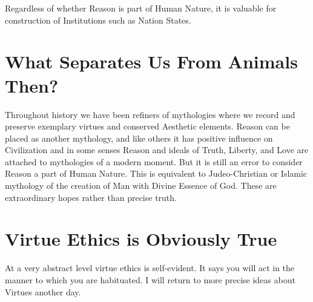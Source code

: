 \documentclass{amsart}
\begin{document}
Regardless of whether Reason is part of Human Nature, it is valuable for construction of Institutions such as Nation States.  

\section{What Separates Us From Animals Then?}

Throughout history we have been refiners of mythologies where we record and preserve exemplary virtues and conserved Aesthetic elements.  Reason can be placed as another mythology, and like others it has positive influence on Civilization and in some senses Reason and ideals of Truth, Liberty, and Love are attached to mythologies of a modern moment.  But it is still an error to consider Reason a part of Human Nature.  This is equivalent to Judeo-Christian or Islamic mythology of the creation of Man with Divine Essence of God.  These are extraordinary hopes rather than precise truth.

\section{Virtue Ethics is Obviously True}
At a very abstract level virtue ethics is self-evident.  It says you will act in the manner to which you are habituated.  I will return to more precise ideas about Virtues another day.
\end{document}
